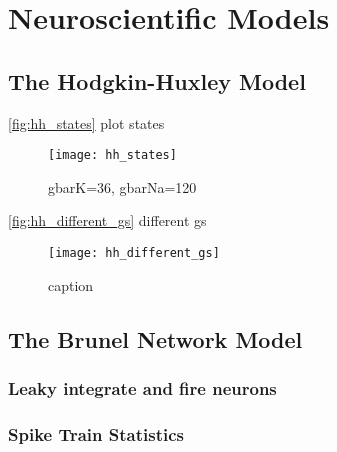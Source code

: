 



\chapter{Neuroscientific Models}\label{chap:compneuro}


\section{The Hodgkin-Huxley Model}

\autoref{fig:hh_states} plot states

\begin{figure}[H]
    \centering
    \texttt{[image: hh\_states]}
    \caption{gbarK=36, gbarNa=120
    }
    \label{fig:hh_states}
\end{figure}

\autoref{fig:hh_different_gs} different gs

\begin{figure}[H]
    \centering
    \texttt{[image: hh\_different\_gs]}
    \caption{caption
    }
    \label{fig:hh_different_gs}
\end{figure}

\section{The Brunel Network Model}

\subsection{Leaky integrate and fire neurons}

\subsection{Spike Train Statistics}

